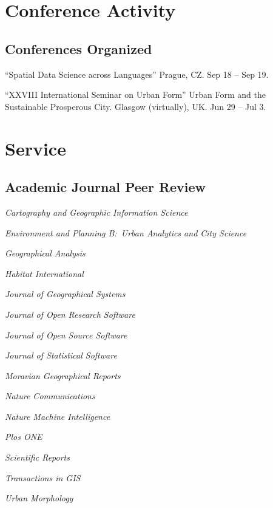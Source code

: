\documentclass[12pt,a4paper]{report}
\newcommand{\listitemspace}{0.25em}
\renewenvironment{itemize}
{\begin{list}{}{\setlength{\leftmargin}{0em}
                \setlength{\parskip}{0em}
                \setlength{\itemsep}{\listitemspace}
                \setlength{\parsep}{\listitemspace}}}
{\end{list}}
\begin{document}
    \section*{Conference Activity}


    \subsection*{Conferences Organized}

    \begin{tablist}

        \item[2024] \tab{}\enquote{Spatial Data Science across Languages} Prague, CZ. Sep 18 -- Sep 19.
        \item[2021] \tab{}\enquote{XXVIII International Seminar on Urban Form} Urban Form and the Sustainable Prosperous City. Glasgow (virtually), UK. Jun 29 -- Jul 3.

    \end{tablist}

    \section*{Service}

    \subsection*{Academic Journal Peer Review}

    \begin{itemize}

        \item \textit{Cartography and Geographic Information Science}
        \item \textit{Environment and Planning B:\ Urban Analytics and City Science}
        \item \textit{Geographical Analysis}
        \item \textit{Habitat International}
        \item \textit{Journal of Geographical Systems}
        \item \textit{Journal of Open Research Software}
        \item \textit{Journal of Open Source Software}
        \item \textit{Journal of Statistical Software}
        \item \textit{Moravian Geographical Reports}
        \item \textit{Nature Communications}
        \item \textit{Nature Machine Intelligence}
        \item \textit{Plos ONE}
        \item \textit{Scientific Reports}
        \item \textit{Transactions in GIS}
        \item \textit{Urban Morphology}

    \end{itemize}
\end{document}
